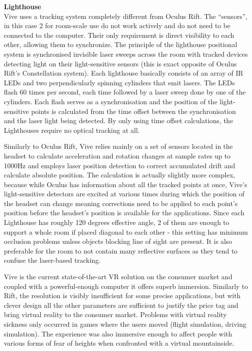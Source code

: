 \documentclass[12pt, a4paper]{article}
\begin{document}
\textbf{Lighthouse} \\
Vive uses a tracking system completely different from Oculus Rift. The “sensors”, in this case 2 for room-scale use do not work actively and do not need to be connected to the computer. Their only requirement is direct visibility to each other, allowing them to synchronize. The principle of the lighthouse positional system is synchronised invisible laser sweeps across the room with tracked devices detecting light on their light-sensitive sensors (this is exact opposite of Oculus Rift’s Constellation system). Each lighthouse basically consists of an array of IR LEDs and two perpendicularly spinning cylinders that emit lasers. The LEDs flash 60 times per second, each time followed by a laser sweep done by one of the cylinders. Each flash serves as a synchronisation and the position of the light-sensitive points is calculated from the time offset between the synchronisation and the laser light being detected. By only using time offset calculations, the Lighthouses require no optical tracking at all.


Similarly to Oculus Rift, Vive relies mainly on a set of sensors located in the headset to calculate acceleration and rotation changes at sample rates up to 1000Hz and employs laser position detection to correct accumulated drift and calculate absolute position. The calculation is actually slightly more complex, because while Oculus has information about all the tracked points at once, Vive’s light-sensitive detectors are excited at various times during which the position of the headset can change meaning corrections need to be applied to each point’s position before the headset’s position is available for the applications. Since each Lighthouse has roughly 120 degrees effective angle, 2 of them are enough to support a whole room if placed diagonal to each other - this setting has minimum occlusion problems unless objects blocking line of sight are present. It is also preferable for the room to not contain many reflective surfaces as they tend to confuse the laser-based tracking.

Vive is the current state-of-the-art VR solution on the consumer market and coupled with a powerful-enough computer it offers superb immersion. Similarly to Rift, the resolution is visibly insufficient for some precise applications, but with clever design all the other parameters are sufficient to justify the price tag and bring virtual reality to the consumer market. Problems with virtual reality sickness only occurred in games where the users moved (flight simulation, driving simulation). The experience was also immersive enough to affect people with various forms of fear of heights when confronted with a virtual mountainside.
\end{document}
